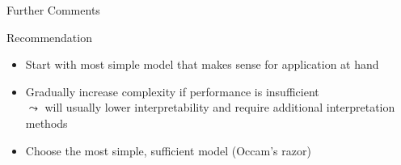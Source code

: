 \documentclass[11pt,compress,t,notes=noshow, aspectratio=169, xcolor=table]{beamer}
\begin{document}
\begin{frame}{Further Comments}
    \smallskip
    

\end{frame}


\begin{frame}{Recommendation}
    \begin{itemize}
        \item Start with most simple model that makes sense for application at hand
        \item Gradually increase complexity if performance is insufficient\\
        $\leadsto$ will usually lower interpretability and require additional interpretation methods
        \item Choose the most simple, sufficient model (Occam's razor)
    \end{itemize} 

    \bigskip


\end{frame}
\end{document}
